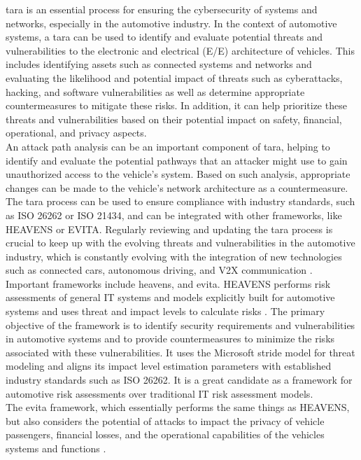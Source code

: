 \acrshort{tara} is an essential process for ensuring the cybersecurity of systems and networks, especially in the automotive industry. 
In the context of automotive systems, a \acrshort{tara} can be used to identify and evaluate potential threats and vulnerabilities to the electronic and electrical (E/E) architecture of vehicles.
This includes identifying assets such as connected systems and networks and evaluating the likelihood and potential impact of threats such as 
cyberattacks, hacking, and software vulnerabilities as well as determine appropriate countermeasures to mitigate these risks.
In addition, it can help prioritize these threats and vulnerabilities based on their potential impact on safety, financial, operational, and privacy aspects.\\
An attack path analysis can be an important component of \acrshort{tara}, helping to identify and evaluate the potential pathways that an attacker might use to gain unauthorized access to the vehicle's system. 
Based on such analysis, appropriate changes can be made to the vehicle's network architecture as a countermeasure.
The \acrshort{tara} process can be used to ensure compliance with industry standards, such as ISO 26262 or ISO 21434, and can be integrated with other frameworks, like HEAVENS or EVITA. 
Regularly reviewing and updating the \acrshort{tara} process is crucial to keep up with the evolving threats and vulnerabilities in the automotive industry, 
which is constantly evolving with the integration of new technologies such as connected cars, autonomous driving, and V2X communication \cite{tara}.\\

Important frameworks include \acrshort{heavens}, and \acrshort{evita}.
HEAVENS performs risk assessments of general IT systems and models explicitly built for automotive systems and uses threat and impact levels to calculate risks \cite{heavens}.
The primary objective of the framework is to identify security requirements and vulnerabilities in automotive systems and to provide countermeasures to minimize the risks associated with these vulnerabilities. 
It uses the Microsoft \acrshort{stride} model for threat modeling and aligns its impact level estimation parameters with established industry standards such as ISO 26262. 
It is a great candidate as a framework for automotive risk assessments over traditional IT risk assessment models.\\
The \acrshort{evita} framework, which essentially performs the same things as HEAVENS, 
but also considers the potential of attacks to impact the privacy of vehicle passengers, financial losses, and the operational capabilities of the vehicles systems and functions \cite{evita}.\\

